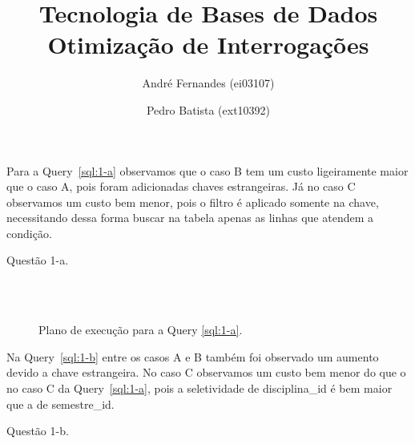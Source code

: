 \documentclass[a4paper,12pt]{article}
\title{Tecnologia de Bases de Dados\\
Otimização de Interrogações}
\author{André Fernandes (ei03107) \and Pedro Batista (ext10392)}
\begin{document}
\maketitle

Para a Query~\ref{sql:1-a} observamos que o caso B tem um custo
ligeiramente maior que o caso A, pois foram adicionadas chaves estrangeiras.
Já no caso C observamos um custo bem menor, pois o filtro é aplicado
somente na chave, necessitando dessa forma buscar na tabela apenas as linhas que
atendem a condição.

\begin{program}
   
   \caption{Questão 1-a.}
   \label{sql:1-a}
\end{program}

\begin{figure}[thp]
   \begin{center}
      \\
      \\
   \end{center}
   \caption{Plano de execução para a Query \ref{sql:1-a}.}
   \label{fig:plano_1-a}
\end{figure}

Na Query~\ref{sql:1-b} entre os casos A e B também foi observado um aumento
devido a chave estrangeira. No caso C observamos um custo bem menor
do que o no caso C da Query~\ref{sql:1-a}, pois a seletividade de disciplina\_id
é bem maior que a de semestre\_id.

\begin{program}
   
   \caption{Questão 1-b.}
   \label{sql:1-b}
\end{program}
\end{document}
